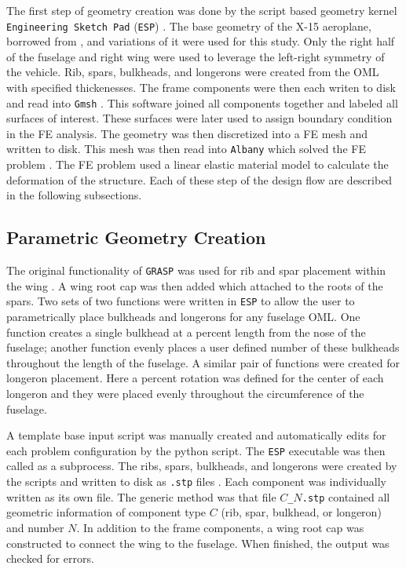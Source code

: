 \documentclass[conf]{new-aiaa}
\begin{document}
The first step of geometry creation was done by the script based geometry
kernel \texttt{Engineering Sketch Pad} (\texttt{ESP}) 
\cite{haimes_ESP_solid_modeling_feature_based_web_enabled_system_param_geom}.
The base geometry of the X-15 aeroplane, borrowed from 
\cite{gochenaur_rapid_geometry_generation_and_basic_comparison_x15},
and variations of it were used for this study.
Only the right half of the fuselage and right wing were
used to leverage the left-right symmetry of the vehicle.
Rib, spars, bulkheads, and longerons were created from the 
OML with specified thickenesses.
The frame components were then each writen to disk
and read into \texttt{Gmsh} 
\cite{geuzaine_GMSH_3D_FE_mesh_generator}.
This software joined all components together and
labeled all surfaces of interest.
These surfaces were later used to assign boundary 
condition in the FE analysis.
The geometry was then discretized into a FE mesh and written to disk.
This mesh was then read into \texttt{Albany} which
solved the FE problem
\cite{salinger_albany_using_component_based_design_to_dev_flex_multiphysics}.
The FE problem used a linear elastic material model to 
calculate the deformation of the structure.
Each of these step of the design flow are described 
in the following subsections.

\subsection{Parametric Geometry Creation}
The original functionality of \texttt{GRASP} was
used for rib and spar placement within the wing
\cite{clough_automated_wing_internal_structure_placement_guided_by_FEA}.
A wing root cap %
was then added which attached to the roots of the spars.
Two sets of two functions were written in \texttt{ESP}
to allow the user to parametrically place bulkheads and 
longerons for any fuselage OML.
One function creates a single bulkhead at a percent length
from the nose of the fuselage;
another function evenly places a user defined number
of these bulkheads throughout the length of the fuselage.
A similar pair of functions were created for longeron 
placement. 
Here a percent rotation was defined for the 
center of each longeron and they were placed 
evenly throughout the circumference of the fuselage.

A template base input script was manually created and automatically 
edits for each problem configuration by the python script.
The \texttt{ESP} executable was then called as a subprocess.
The ribs, spars, bulkheads, and longerons were created by 
the scripts and written to disk as \texttt{.stp} files
\cite{iso_10303_21_2016_step_files}.
Each component was individually written as its own file.
The generic method was that file \texttt{$C$\_$N$.stp}
contained all geometric information of component type $C$ 
(rib, spar, bulkhead, or longeron) and number $N$.
In addition to the frame components,
a wing root cap was constructed to connect
the wing to the fuselage.
When finished, the output was checked for errors.
\end{document}
